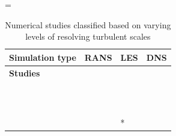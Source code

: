 \documentclass[a4paper,12pt]{elsarticle}
\begin{document}
\begin{center}
\footnotesize
\LTcapwidth=\textwidth
\begin{longtable}{|m{3cm}|m{4.3cm}|m{4.4cm}|m{3.2cm}|}
    \caption{Numerical studies classified based on varying levels of resolving turbulent scales}
    \label{tab:num}\\
    \hline
    \textbf{Simulation type} & \textbf{RANS} & \textbf{LES} & \textbf{DNS} \\
    \hline
    \textbf{Studies} & \citet{ren2021numerical} & \citet{feng2020study} & \citet{giri2022colliding} \\
    
     & \citet{li2020investigating} & \citet{khosronejad2020fluid} & \citet{chong2021extended} \\
    
     & \citet{dbouk2020respiratory} & \citet{zhang2019distribution} & \citet{diwan2020understanding} \\
    
     & \citet{liu2020experimental} & \citet{berrouk2010experimental} & \citet{singhal2022virus} \\
    
     & \citet{dbouk2020coughing} & \citet{pendar2020numerical} & \citet{rosti2020fluid} \\
    
     & \citet{aliyu2021dispersion} & \citet{abkarian2020speech} &  \\
    
     & \citet{zhou2021experimental} & \citet{saarinen2015large} &  \\
    
     & \citet{mirzaie2021covid} & \citet{li2023transient} &  \\
    
     & \citet{qian2008dispersion} & \citet{liu2021simulation} &  \\
    
     & \citet{li2005role} & \citet{quintero2022reducing} &  \\
    
     & \citet{villafruela2019assessment} & \citet{buchan2020predicting} &  \\
    
     & \citet{he2011cfd} & \citet{wu2023numerical} &  \\
    
     & \citet{jiang2009investigating} & \citet{fontes2020study}* &  \\
    

\end{longtable}
\end{center}
\end{document}
